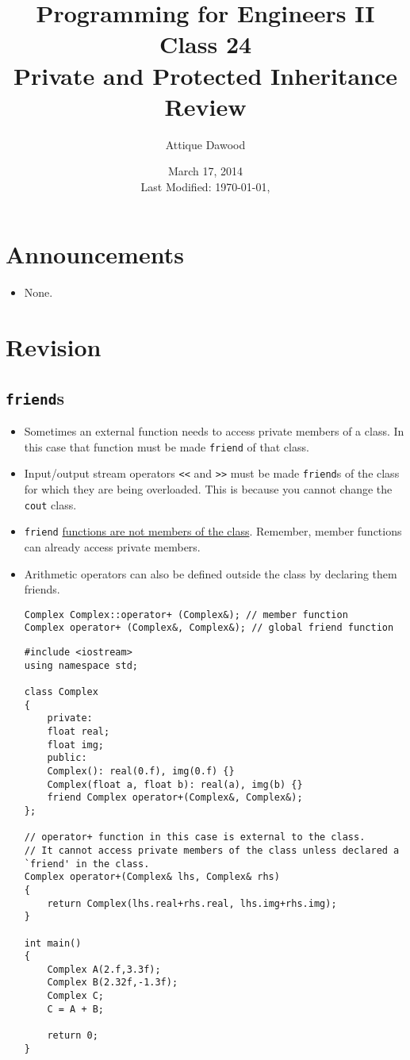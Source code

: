 \documentclass[12pt,a4paper]{article}
\title{\vspace{-2cm}Programming for Engineers II\\Class 24\\Private and Protected Inheritance\\Review}
\author{Attique Dawood}
\date{March 17, 2014\\[0.2cm] Last Modified: \today, \currenttime}
\begin{document}
\maketitle
\section{Announcements}
\begin{itemize}
\item None.
\end{itemize}
\section{Revision}
\subsection{\texttt{friend}s}
\begin{itemize}
\item Sometimes an external function needs to access private members of a class. In this case that function must be made \verb|friend| of that class.
\item Input/output stream operators \verb|<<| and \verb|>>| must be made \verb|friend|s of the class for which they are being overloaded. This is because you cannot change the \verb|cout| class.
\item \verb|friend| \underline{functions are not members of the class}. Remember, member functions can already access private members.
\item Arithmetic operators can also be defined outside the class by declaring them friends.
\begin{lstlisting}[caption={operator+ prototype as member function and as \texttt{friend}}]
Complex Complex::operator+ (Complex&); // member function
Complex operator+ (Complex&, Complex&); // global friend function
\end{lstlisting}
\begin{lstlisting}[caption={operator+ implemented as \texttt{friend}}]
#include <iostream>
using namespace std;

class Complex
{
	private:
	float real;
	float img;
	public:
	Complex(): real(0.f), img(0.f) {}
	Complex(float a, float b): real(a), img(b) {}
	friend Complex operator+(Complex&, Complex&);
};

// operator+ function in this case is external to the class.
// It cannot access private members of the class unless declared a `friend' in the class.
Complex operator+(Complex& lhs, Complex& rhs)
{
	return Complex(lhs.real+rhs.real, lhs.img+rhs.img);
}

int main()
{
	Complex A(2.f,3.3f);
	Complex B(2.32f,-1.3f);
	Complex C;
	C = A + B;

	return 0;
}
\end{lstlisting}
\end{itemize}
\end{document}
